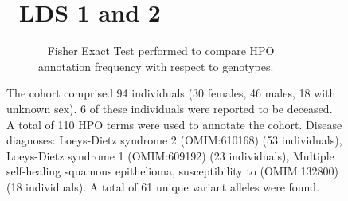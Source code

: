 \begin{figure}[htbp]
\section*{ LDS 1 and 2}
\centering
\begin{subfigure}[b]{0.95\textwidth}
\centering
{}
\captionsetup{justification=raggedright,singlelinecheck=false}
\caption{             Fisher Exact Test performed to compare HPO annotation frequency with respect to genotypes. }
\end{subfigure}

\vspace{2em}

\caption{ The cohort comprised 94 individuals (30 females, 46 males, 18 with unknown sex). 6 of these individuals were reported to be deceased. A total of 110 HPO terms were used to annotate the cohort. Disease diagnoses: Loeys-Dietz syndrome 2 (OMIM:610168) (53 individuals), Loeys-Dietz syndrome 1 (OMIM:609192) (23 individuals), Multiple self-healing squamous epithelioma, susceptibility to (OMIM:132800) (18 individuals). A total of 61 unique variant alleles were found.}
\end{figure}
